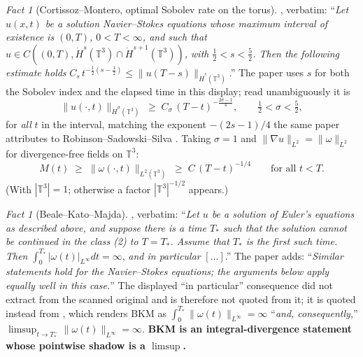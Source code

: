 \documentclass[11pt]{article}
\theoremstyle{definition}
\theoremstyle{remark}
\newtheorem{fact}[theorem]{Fact}
\newcommand{\T}{\mathbb{T}}
\begin{document}
\begin{fact}[Cortissoz--Montero, optimal Sobolev rate on the torus]
  \label{fact:s50-cm}
  \cite[Thm.~2.1]{CortissozMontero2016}, verbatim: ``\emph{Let $u(x,t)$ be a
  solution Navier--Stokes equations whose maximum interval of existence is
  $(0,T)$, $0<T<\infty$, and such that
  $u\in C((0,T),\dot H^s(\T^3)\cap\dot H^{s+1}(\T^3))$, with
  $\tfrac12<s<\tfrac52$. Then the following estimate holds}
  $C_s\,t^{-\frac12(s-\frac12)}\leq\|u(T-s)\|_{\dot H^s(\T^3)}$.'' The paper
  uses $s$ for both the Sobolev index and the elapsed time in this display;
  read unambiguously it is
  \[
    \|u(\cdot,t)\|_{\dot H^\sigma(\T^3)}
      \;\geq\; C_\sigma\,(T-t)^{-\frac{2\sigma-1}{4}},
    \qquad \tfrac12<\sigma<\tfrac52,
  \]
  for \emph{all} $t$ in the interval, matching the exponent
  $-(2s-1)/4$ the same paper attributes to Robinson--Sadowski--Silva
  \cite{RobinsonSadowskiSilva2012}. Taking $\sigma=1$ and
  $\|\nabla u\|_{L^2}=\|\omega\|_{L^2}$ for divergence-free fields on $\T^3$:
  \begin{equation}\label{eq:s50-quarter}
    M(t) \;\geq\; \|\omega(\cdot,t)\|_{L^2(\T^3)}
      \;\geq\; C\,(T-t)^{-1/4}
    \qquad\text{for all } t<T .
  \end{equation}
  (With $|\T^3|=1$; otherwise a factor $|\T^3|^{-1/2}$ appears.)
\end{fact}

\begin{fact}[Beale--Kato--Majda]\label{fact:s50-bkm}
  \cite[Theorem]{BKM1984}, verbatim: ``\emph{Let $u$ be a solution of Euler's
  equations as described above, and suppose there is a time $T_*$ such that
  the solution cannot be continued in the class \textup{(2)} to $T=T_*$.
  Assume that $T_*$ is the first such time. Then}
  $\int_0^{T_*}|\omega(t)|_{L^\infty}dt=\infty$, \emph{and in particular}
  $[\dots]$.'' The paper adds: ``\emph{Similar statements hold for the
  Navier--Stokes equations; the arguments below apply equally well in this
  case.}'' The displayed ``in particular'' consequence did not extract from
  the scanned original and is therefore not quoted from it; it is quoted
  instead from \cite[(1.4)]{IngimarsonKukavica2026}, which renders BKM as
  $\int_0^{T_*}\|\omega(t)\|_{L^\infty}=\infty$ ``\emph{and, consequently,}''
  $\limsup_{t\to T_*^-}\|\omega(t)\|_{L^\infty}=\infty$. \textbf{BKM is an
  integral-divergence statement whose pointwise shadow is a
  $\limsup$.}
\end{fact}
\end{document}

